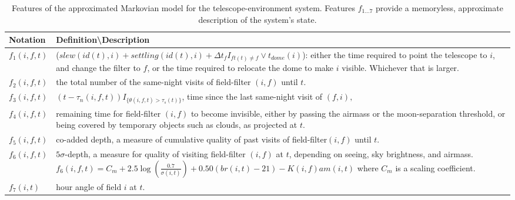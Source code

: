 \documentclass[11pt]{article}
\theoremstyle{definition}
\begin{document}
\begin{table}
\caption{Features of the approximated Markovian model for the telescope-environment system. Features $f_{1\dots 7}$ provide a memoryless, approximate description of the system's state.}
\begin{tabularx}{\textwidth}{|l|X|}
\hline
Notation & Definition\textbackslash Description\\ \hline \hline 
$f_1(i,f,t)$ & ($slew(id(t),i)+settling(id(t),i)+\Delta t_{f} I_{ft(t) \neq f} \vee t_{dome}(i)$): either the time required to point the telescope to $i$, and change the filter to $f$, or the time required to relocate the dome to make $i$ visible. Whichever that is larger.\\ \hline
$f_2(i,f,t)$ &  the total number of the same-night visits of field-filter $(i,f)$ until $t$.\\ \hline
$f_3(i,f,t)$ &  $(t - \tau_n(i,f,t)) I_{\{\theta(i,f,t) > \tau_s(t)\}}$, time since the last same-night visit of $(f,i),$\\ \hline
$f_4(i,f,t)$ &  remaining time for field-filter $(i,f)$ to become invisible, either by passing the airmass or the moon-separation threshold, or being covered by temporary objects such as clouds, as projected at $t$.\\ \hline
$f_5(i,f,t)$ &  co-added depth, a measure of cumulative quality of past visits of field-filter$(i,f)$ until $t$.\\ \hline
$f_6(i,f,t)$ &  $5\sigma$-depth, a measure for quality of visiting field-filter $(i,f)$ at $t$, depending on seeing, sky brightness, and airmass. $f_6(i,f,t) = C_m + 2.5 \log (\frac{0.7}{\sigma(i,t)}) + 0.50 (br(i,t)-21) - K(i,f) am(i,t)$ where $C_m$ is a scaling coefficient.\\ \hline
$f_7(i,t)$  & hour angle of field $i$ at $t$.\\ \hline
\hline
\end{tabularx}
\end{table}\label{tab_features}
\end{document}

